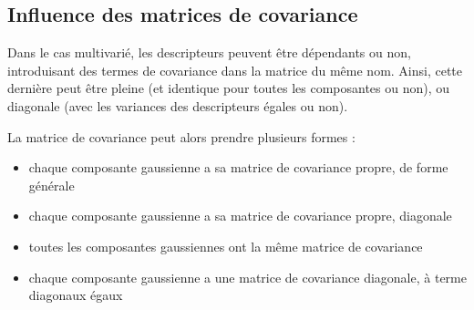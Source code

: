 \documentclass[letterpaper,10pt,french]{sphinxmanual}
\begin{document}
\subsection{Influence des matrices de covariance}
\label{\detokenize{clustering:influence-des-matrices-de-covariance}}
\sphinxAtStartPar
Dans le cas multivarié, les descripteurs peuvent être dépendants ou non, introduisant des termes de covariance dans la matrice du même nom. Ainsi, cette dernière peut être pleine (et identique pour toutes les composantes ou non), ou diagonale (avec les variances des descripteurs égales ou non).

\sphinxAtStartPar
La matrice de covariance peut alors prendre plusieurs formes :
\begin{itemize}
\item {} 
\sphinxAtStartPar
chaque composante gaussienne a sa matrice de covariance propre, de forme générale

\item {} 
\sphinxAtStartPar
chaque composante gaussienne a sa matrice de covariance propre, diagonale

\item {} 
\sphinxAtStartPar
toutes les composantes gaussiennes ont la même matrice de covariance

\item {} 
\sphinxAtStartPar
chaque composante gaussienne a une matrice de covariance diagonale, à terme diagonaux égaux

\end{itemize}
\end{document}
